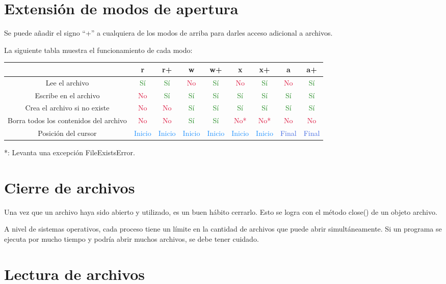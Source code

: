 \documentclass{report}
\newcommand{\doble}[1]{``#1''}
\newcommand{\si}{\textcolor{ForestGreen}{Sí}}
\newcommand{\no}{\textcolor{Crimson}{No}}
\newcommand{\noo}{\textcolor{Crimson}{No*}}
\newcommand{\inicio}{\textcolor{DodgerBlue}{Inicio}}
\newcommand{\final}{\textcolor{RoyalBlue}{Final}}
\begin{document}
{\section{Extensión de modos de apertura}

Se puede añadir el signo \doble{+} a cualquiera de los modos de arriba para darles acceso adicional a archivos.

La siguiente tabla muestra el funcionamiento de cada modo:


\begin{center}
  \begin{tabular}{ |c|c|c|c|c|c|c|c|c| }
    \hline
    & r & r+ & w & w+ & x & x+ & a & a+ \\
    \hline
    Lee el archivo & \si & \si & \no & \si & \no & \si & \no & \si \\
    \hline
    Escribe en el archivo & \no & \si & \si & \si & \si & \si & \si & \si \\
    \hline
    Crea el archivo si no existe & \no & \no & \si & \si & \si & \si & \si & \si \\
    \hline
    Borra todos los contenidos del archivo & \no & \no & \si & \si & \noo & \noo & \no & \no \\
    \hline
    Posición del cursor & \inicio & \inicio & \inicio & \inicio & \inicio & \inicio & \final & \final \\
    \hline
  \end{tabular}
\end{center}

*: Levanta una excepción FileExistsError.

\section{Cierre de archivos}

Una vez que un archivo haya sido abierto y utilizado, es un buen hábito cerrarlo. Esto se logra con el método close() de un objeto archivo.


A nivel de sistemas operativos, cada proceso tiene un límite en la cantidad de archivos que puede abrir simultáneamente. Si un programa se ejecuta por mucho tiempo y podría abrir muchos archivos, se debe tener cuidado.

\section{Lectura de archivos}

}
\end{document}
